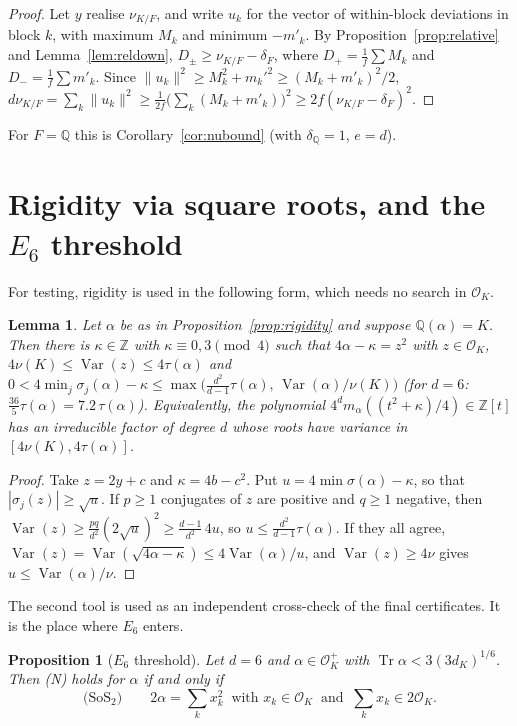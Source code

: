 \documentclass[11pt]{amsart}
\newtheorem{lemma}[theorem]{Lemma}
\newtheorem{proposition}[theorem]{Proposition}
\theoremstyle{definition}
\DeclareMathOperator{\Tr}{Tr}
\DeclareMathOperator{\Var}{Var}
\newcommand{\OK}{\mathcal{O}_K}
\newcommand{\Q}{\mathbb{Q}}
\newcommand{\Z}{\mathbb{Z}}
\newcommand{\nurel}{\nu_{K/F}}
\begin{document}
\begin{proof}
Let $y$ realise $\nurel$, and write $u_k$ for the vector of within-block deviations in block
$k$, with maximum $M_k$ and minimum $-m'_k$.  By Proposition~\ref{prop:relative} and
Lemma~\ref{lem:reldown}, $D_\pm\ge\nurel-\delta_F$, where $D_+=\frac1f\sum M_k$ and
$D_-=\frac1f\sum m'_k$.  Since $\|u_k\|^2\ge M_k^2+m_k'^2\ge(M_k+m'_k)^2/2$,
$d\nurel=\sum_k\|u_k\|^2\ge\frac1{2f}\bigl(\sum_k(M_k+m'_k)\bigr)^2\ge2f(\nurel-\delta_F)^2$.
\end{proof}

For $F=\Q$ this is Corollary~\ref{cor:nubound} (with $\delta_\Q=1$, $e=d$).

\section{Rigidity via square roots, and the \texorpdfstring{$E_6$}{E6} threshold}\label{sec:e6}

For testing, rigidity is used in the following form, which needs no search in $\OK$.

\begin{lemma}\label{lem:sqshape}
Let $\alpha$ be as in Proposition~\ref{prop:rigidity} and suppose $\Q(\alpha)=K$.  Then there
is $\kappa\in\Z$ with $\kappa\equiv0,3\pmod4$ such that $4\alpha-\kappa=z^2$ with $z\in\OK$,
$4\nu(K)\le\Var(z)\le4\tau(\alpha)$ and
$0<4\min_j\sigma_j(\alpha)-\kappa\le\max\bigl(\frac{d^2}{d-1}\tau(\alpha),\,\Var(\alpha)/\nu(K)\bigr)$
(for $d=6$: $\frac{36}5\tau(\alpha)=7.2\,\tau(\alpha)$).
Equivalently, the polynomial $4^d m_\alpha((t^2+\kappa)/4)\in\Z[t]$ has an irreducible factor
of degree $d$ whose roots have variance in $[4\nu(K),4\tau(\alpha)]$.
\end{lemma}

\begin{proof}
Take $z=2y+c$ and $\kappa=4b-c^2$.  Put $u=4\min\sigma(\alpha)-\kappa$, so that
$|\sigma_j(z)|\ge\sqrt u$.  If $p\ge1$ conjugates of $z$ are positive and $q\ge1$ negative, then
$\Var(z)\ge\frac{pq}{d^2}(2\sqrt u)^2\ge\frac{d-1}{d^2}\,4u$, so $u\le\frac{d^2}{d-1}\tau(\alpha)$.  If they all agree,
$\Var(z)=\Var(\sqrt{4\alpha-\kappa})\le4\Var(\alpha)/u$, and $\Var(z)\ge4\nu$ gives
$u\le\Var(\alpha)/\nu$.
\end{proof}

The second tool is used as an independent cross-check of the final certificates.  It is the
place where $E_6$ enters.

\begin{proposition}[$E_6$ threshold]\label{prop:e6}
Let $d=6$ and $\alpha\in\OK^+$ with $\Tr\alpha<3(3d_K)^{1/6}$.  Then (N) holds for $\alpha$ if
and only if
\[
\text{(SoS$_2$)}\qquad 2\alpha=\sum_k x_k^2\ \text{ with } x_k\in\OK\ \text{ and }\ \sum_kx_k\in2\OK .
\]
\end{proposition}
\end{document}
